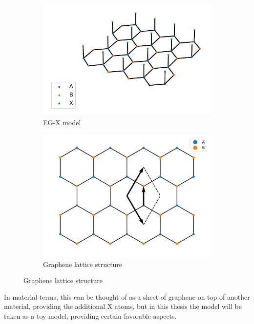 \documentclass[../main.tex]{subfiles}
\begin{document}
\begin{figure}[t]
	\begin{subfigure}{0.5\linewidth}
		\centering
		\includegraphics[width=\linewidth]{images/eg-x lattice cropped}
		\caption{EG-X model}
		\label{fig:eg-x model}
	\end{subfigure}
	\begin{subfigure}{0.5\linewidth}
		\centering
		\includegraphics[width=\linewidth]{images/graphene lattice}
		\caption{Graphene lattice structure}
		\label{fig:graphene lattice structure}
	\end{subfigure}
\end{figure}
In material terms, this can be thought of as a sheet of graphene on top of another material, providing the additional \(\mathrm{X}\) atoms, but in this thesis the model will be taken as a toy model, providing certain favorable aspects.
\end{document}
